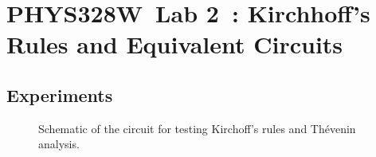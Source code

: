 \documentclass[11pt]{article}
\newcommand{\COURSE}{PHYS328W}
\newcommand{\LABNUM}{2}
\newcommand{\TITLE}{Kirchhoff's Rules and Equivalent Circuits}
\begin{document}
\thispagestyle{empty}

\section*{\COURSE\ Lab \LABNUM\ : \TITLE}

\subsection*{Experiments}

\begin{figure}[h]
  \centering
  \caption{Schematic of the circuit for testing Kirchoff's rules and
    Th\'{e}venin analysis.} 
  \label{fig:thevenincircuit}
\end{figure}
\end{document}
